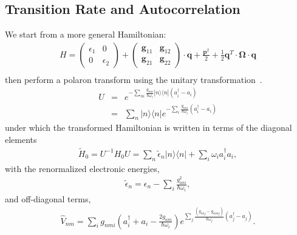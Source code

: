 \subsection{Transition Rate and Autocorrelation}
We start from a more general Hamiltonian:
\begin{eqnarray}
H=\left(\begin{array}{cc}
\epsilon_{1} & 0\\
0 & \epsilon_{2}
\end{array}\right)+\left(\begin{array}{cc}
{\mathbf g}_{11}&{\mathbf g}_{12} \\
{\mathbf g}_{21} &{\mathbf g}_{22}
\end{array}\right)\cdot{\mathbf q} +\frac{{\mathbf p}^{2}}{2}+\frac{1}{2}\mathbf{q}^{T}\cdot\mathbf\Omega\cdot\mathbf{q}
\nonumber \\
\end{eqnarray}
then perform a polaron transform
using the unitary transformation~\cite{grover1970exciton,rice1994excitons,pereverzev2006time}.
\begin{eqnarray}
U&=&e^{-\sum_{ni}\!\!\frac{g_{nni}}{\hbar\omega_i}|n\rangle \langle
n|(a^{\dagger}_i-a_i)}
 \nonumber \\
&=&
\sum_{n}|n\rangle \langle n|e^{-\sum_{i}\!\!\frac{g_{nni}}{\hbar\omega_i}(a^{\dagger}_i-a_i)}
\end{eqnarray}
under which the transformed Hamiltonian is written in terms of the
diagonal elements
\begin{eqnarray} \tilde H_0=U^{-1}H_0U
=\sum_n\tilde\epsilon_n |n\rangle \langle
n|+\sum_i\omega_ia^{\dagger}_ia_i,
 \end{eqnarray}
with  the renormalized electronic energies,
\begin{eqnarray}
\tilde\epsilon_n=\epsilon_n-\sum_{i}\frac{g_{nni}^2}{\hbar\omega_i},
\end{eqnarray}
and off-diagonal terms,
\begin{eqnarray} \hat V_{nm}=\sum_{i}g_{nmi}\left(a^{\dagger}_i+
a_i-\frac{2g_{nni}}{\hbar\omega_i}\right)e^{\sum_{j}\frac{(g_{nnj}-g_{mmj})}{\hbar\omega_j}(a^{\dagger}_j-a_j)}.
\end{eqnarray}
